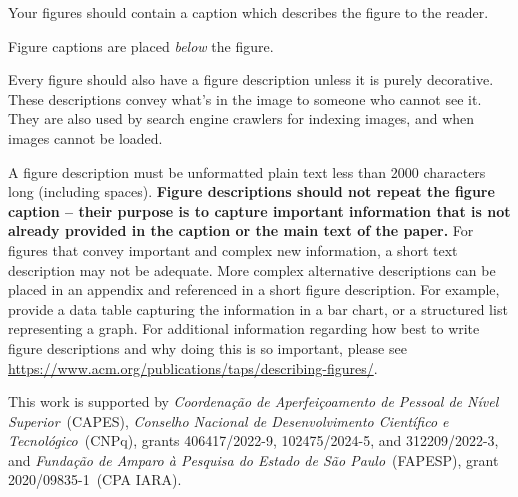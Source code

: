 \documentclass[sigconf,natbib=false]{acmart}
\begin{document}
Your figures should contain a caption which describes the figure to
the reader.

Figure captions are placed {\itshape below} the figure.

Every figure should also have a figure description unless it is purely
decorative. These descriptions convey what’s in the image to someone
who cannot see it. They are also used by search engine crawlers for
indexing images, and when images cannot be loaded.

A figure description must be unformatted plain text less than 2000
characters long (including spaces).  {\bfseries Figure descriptions
  should not repeat the figure caption – their purpose is to capture
  important information that is not already provided in the caption or
  the main text of the paper.} For figures that convey important and
complex new information, a short text description may not be
adequate. More complex alternative descriptions can be placed in an
appendix and referenced in a short figure description. For example,
provide a data table capturing the information in a bar chart, or a
structured list representing a graph.  For additional information
regarding how best to write figure descriptions and why doing this is
so important, please see
\url{https://www.acm.org/publications/taps/describing-figures/}.


\begin{acks}
This work is supported by \textit{Coordenação de Aperfeiçoamento de Pessoal de Nível Superior}~(CAPES), \textit{Conselho Nacional de Desenvolvimento Científico e Tecnológico}~(CNPq), grants 406417/2022-9, 102475/2024-5, and 312209/2022-3, and \textit{Fundação de Amparo à Pesquisa do Estado de São Paulo}~(FAPESP), grant 2020/09835-1~(CPA IARA). 
\end{acks}


\printbibliography
\end{document}
